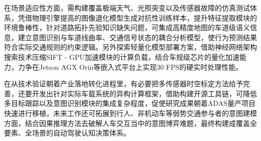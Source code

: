在场景适应性方面，需构建覆盖极端天气、光照突变以及传感器故障的仿真测试体系，凭借物理引擎提高的图像退化模型生成对抗性训练样本，提升特征提取模块的环境鲁棒性，针对道路拓扑先验知识缺失问题，可集成高精度地图的车道级语义信息，建立意图识别与车道线曲率、交通信号状态的耦合分析模型，使行为预测结果符合实际交通规则的约束逻辑。另外探索轻量化模型部署方案，借助神经网络架构搜索技术压缩SIFT - GPU加速模块的计算负载，结合车规级芯片的量化加速能力，力争在Jetson AGX Orin等嵌入式平台上实现30 FPS的硬实时处理性能。

在从技术验证朝着产业落地转化进程里，有必要把多传感器时空标定方法给予完善，还要开发出针对实际车载系统的异构计算框架，借助构建开源工具链，可降低多目标跟踪以及意图识别模块的集成复杂程度，促使研究成果朝着ADAS量产项目快速进行移植，未来工作还可拓展到行人、非机动车等弱势交通参与者的意图建模方面，结合因果推理方法去破解人车交互当中的意图博弈难题，最终构建成覆盖全要素、全场景的自动驾驶认知决策体系。


\begin{tabular}{l l}
\end{tabular}
